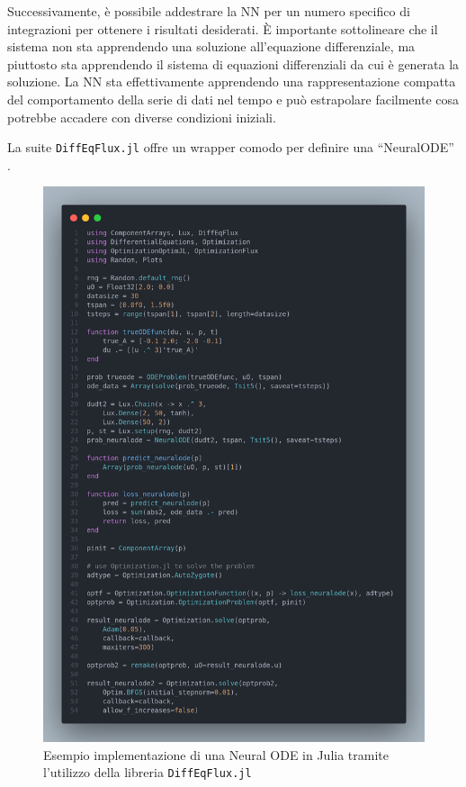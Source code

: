 Successivamente, è possibile addestrare la NN per un numero specifico di 
integrazioni per ottenere i risultati desiderati. È importante 
sottolineare che il sistema non sta apprendendo una soluzione 
all'equazione differenziale, ma piuttosto sta apprendendo il sistema di 
equazioni differenziali da cui è generata la soluzione. La NN sta 
effettivamente apprendendo una rappresentazione compatta del comportamento 
della serie di dati nel tempo e può estrapolare facilmente cosa 
potrebbe accadere con diverse condizioni iniziali. 

La suite \texttt{DiffEqFlux.jl} offre un wrapper comodo per definire una ``NeuralODE'' 
\cite{rackauckas2019diffeqflux}.

\begin{figure}[H]
    \begin{center}
        \includegraphics[width=\textwidth]{img/neuralode.png}
        \caption{Esempio implementazione di una Neural ODE in Julia tramite l'utilizzo della libreria \texttt{DiffEqFlux.jl} \cite{rackauckas2019diffeqflux}}
        \label{fig:NN_Julia_example}
    \end{center}
\end{figure}

